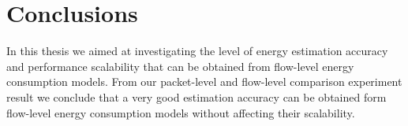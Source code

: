 \chapter{Conclusions}
\label{chapter:conclusions}

In this thesis we aimed at investigating the level of energy estimation accuracy and performance scalability that can be obtained from flow-level energy consumption models. From our packet-level and flow-level comparison experiment result we conclude that a very good estimation accuracy can be obtained form flow-level energy consumption models without affecting their scalability. 
